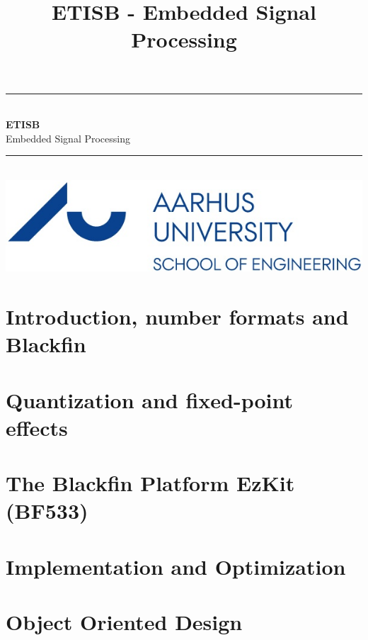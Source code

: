 \documentclass[12pt,a4paper,danish,oneside]{book}
\title{ETISB - Embedded Signal Processing}
\newcommand{\HRule}{\rule{\linewidth}{0.5mm}}
\begin{document}
\begin{titlepage}
	\clearpage\thispagestyle{empty}
	\begin{center}
		\HRule \\[0.4cm]
		{\huge \bfseries ETISB} \\[.3cm] {\huge Embedded Signal Processing}\\[0cm]
		\HRule \\[3.4cm]
		\includegraphics[width=0.5\linewidth]{graphics/au}
	\end{center}
\end{titlepage}

\tableofcontents

\chapter{Introduction, number formats and Blackfin}


\chapter{Quantization and fixed-point effects}


\chapter{The Blackfin Platform EzKit (BF533)}


\chapter{Implementation and Optimization}


\chapter{Object Oriented Design}

\end{document}

